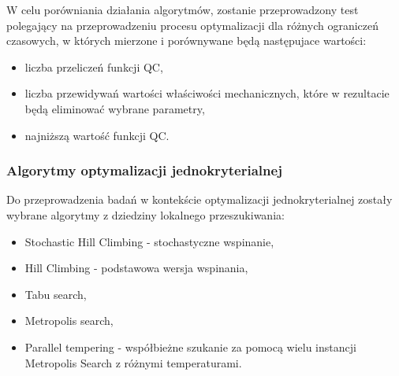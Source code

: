 W celu porówniania działania algorytmów, zostanie przeprowadzony test polegający na przeprowadzeniu procesu optymalizacji dla różnych ograniczeń czasowych, w których mierzone i porównywane będą następujace wartości:
\begin{itemize}
    \item liczba przeliczeń funkcji QC,
    \item liczba przewidywań wartości właściwości mechanicznych, które w rezultacie będą eliminować wybrane parametry,
    \item najniższą wartość funkcji QC.
\end{itemize}

\subsubsection{Algorytmy optymalizacji jednokryterialnej}
Do przeprowadzenia badań w kontekście optymalizacji jednokryterialnej zostały wybrane algorytmy z dziedziny lokalnego przeszukiwania:
\begin{itemize}
    \item Stochastic Hill Climbing - stochastyczne wspinanie,
    \item Hill Climbing - podstawowa wersja wspinania,
    \item Tabu search,
    \item Metropolis search,
    \item Parallel tempering - współbieżne szukanie za pomocą wielu instancji Metropolis Search z różnymi temperaturami.
\end{itemize}



